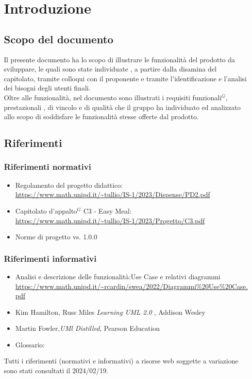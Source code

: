 
\section{Introduzione}

\subsection{Scopo del documento}

Il presente documento ha lo scopo di illustrare le funzionalità del prodotto da sviluppare,
le quali sono state individuate , a partire dalla disamina del capitolato, tramite colloqui con 
il proponente e tramite l'identificazione e l'analisi dei bisogni degli utenti finali.\\
Oltre alle funzionalità, nel documento sono illustrati i requisiti funzionali$^{G}$, prestazionali , di 
vincolo e di qualità che il gruppo ha individuato ed analizzato allo scopo di soddisfare le 
funzionalità stesse offerte dal prodotto. 

\subsection{Riferimenti}
\subsubsection{Riferimenti normativi}

\begin{itemize}
    \item Regolamento del progetto didattico: \\
    \url{https://www.math.unipd.it/~tullio/IS-1/2023/Dispense/PD2.pdf}
    \item Capitolato d’appalto$^{G}$ C3 - Easy Meal: \\
    \url{https://www.math.unipd.it/~tullio/IS-1/2023/Progetto/C3.pdf}
    \item Norme di progetto vs. 1.0.0
\end{itemize}

\subsubsection{Riferimenti informativi} 

\begin{itemize}
    \item Analisi e descrizione delle funzionalità:Use Case e relativi diagrammi \\
    \url{https://www.math.unipd.it/~rcardin/swea/2022/Diagrammi%20Use%20Case.pdf}
    \item Kim Hamilton, Russ Miles \emph{Learning UML 2.0 }, Addison Wesley \\
    \item Martin Fowler,\emph{UMl Distilled}, Pearson Education
    \item Glossario: \
    \url{} %
\end{itemize}

Tutti i riferimenti (normativi e informativi) a risorse web soggette a variazione sono stati consultati il 2024/02/19.